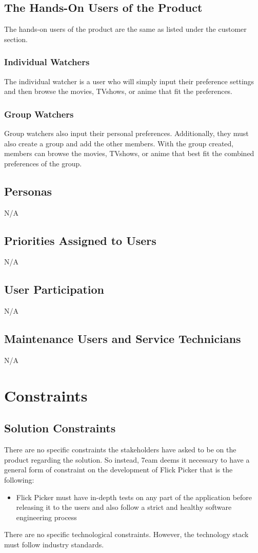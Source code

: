 \documentclass[12pt]{article}
\begin{document}
\subsection{The Hands-On Users of the Product}
The hands-on users of the product are the same as listed under the customer section.

\subsubsection*{Individual Watchers}
The individual watcher is a user who will simply input their preference settings and then browse the movies, TVshows, or anime that fit the preferences.
\subsubsection*{Group Watchers}
Group watchers also input their personal preferences.
Additionally, they must also create a group and add the other members.
With the group created, members can browse the movies, TVshows, or anime that best fit the combined preferences of the group.

\subsection{Personas}
N/A

\subsection{Priorities Assigned to Users}
N/A

\subsection{User Participation}
N/A

\subsection{Maintenance Users and Service Technicians}
N/A

\section{Constraints}

\subsection{Solution Constraints}
There are no specific constraints the stakeholders have asked to be on the product regarding the solution. So instead, 7eam deems it necessary to have a general form of constraint on the development of Flick Picker that is the following:
\begin{itemize}
	\item Flick Picker must have in-depth tests on any part of the application before releasing it to the users and also follow a strict and healthy software engineering process
\end{itemize}
There are no specific technological constraints. However, the technology stack must follow industry standards.
\end{document}
